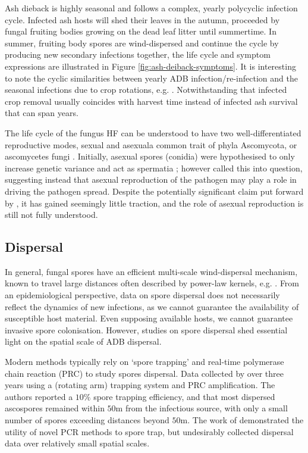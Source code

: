 Ash dieback is highly seasonal \cite{bengtsson2014seasonal} and follows a complex, yearly polycyclic infection cycle.
Infected ash hosts will shed their leaves in the autumn, proceeded by fungal fruiting bodies growing on the dead leaf litter until summertime.
In summer, fruiting body spores are wind-dispersed and continue the cycle by producing new secondary infections\textemdash 
together, the life cycle and symptom expressions are illustrated in Figure \ref{fig:ash-deiback-symptoms}.
It is interesting to note the cyclic similarities between yearly ADB infection/re-infection and the seasonal
infections due to crop rotations, e.g. \cite{tankam2020modelling}. 
Notwithstanding that infected crop removal usually coincides with harvest time instead of infected ash survival that can span years.

The life cycle of the fungus HF can be understood to have two well-differentiated reproductive modes, 
sexual and asexual\textemdash a common trait of phyla Ascomycota, or ascomycetes fungi \cite{hawker2016physiology}.
Initially, asexual spores (conidia) were hypothesised to only increase genetic variance and act as spermatia \cite{gross2014h};
however \cite{fones2016role} called this into question, suggesting instead that asexual reproduction of the pathogen 
may play a role in driving the pathogen spread. Despite the potentially significant claim put forward by \cite{fones2016role},
it has gained seemingly little traction, and the role of asexual reproduction is still not fully understood.

\subsection{Dispersal}

In general, fungal spores have an efficient multi-scale wind-dispersal mechanism,
known to travel large distances \cite{golan2017long, wingen2013long, mundt2009aerial}
often described by power-law kernels, e.g. \cite{shaw2006assembling}.
From an epidemiological perspective, data on spore dispersal does not necessarily reflect the dynamics of new infections, 
as we cannot guarantee the availability of susceptible host material.
Even supposing available hosts, we cannot guarantee invasive spore colonisation.
However, studies on spore dispersal shed essential light on the spatial scale of ADB dispersal. 

Modern methods typically rely on `spore trapping' and real-time polymerase chain reaction (PRC) to study spores dispersal.
Data collected by \cite{chandelier2014detection} over three years using a (rotating arm) trapping system
and PRC amplification. The authors reported a $10\%$ spore trapping efficiency, and that most
dispersed ascospores remained within $50\mathrm{m}$ from the infectious source, with only a small number of spores exceeding 
distances beyond $50\mathrm{m}$. The work of \cite{chandelier2014detection} demonstrated the utility of novel PCR methods
to spore trap, but undesirably collected dispersal data over relatively small spatial scales.

